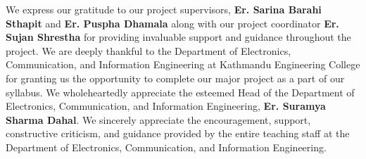 We express our gratitude to our project supervisors,\hspace{0.3cm} \textbf{Er. Sarina Barahi Sthapit} and \hspace{0.3cm}\textbf{Er. Puspha Dhamala} along with our project coordinator\textbf{ Er. Sujan Shrestha} for providing invaluable support and guidance throughout the project. We are deeply thankful to the Department of Electronics, Communication, and Information Engineering at Kathmandu Engineering College for granting us the opportunity to complete our major project as a part of our syllabus. We wholeheartedly appreciate the esteemed Head of the Department of Electronics, Communication, and Information Engineering, \textbf{Er. Suramya Sharma Dahal}. We sincerely appreciate the encouragement, support, constructive criticism, and guidance provided by the entire teaching staff at the Department of Electronics, Communication, and Information Engineering.